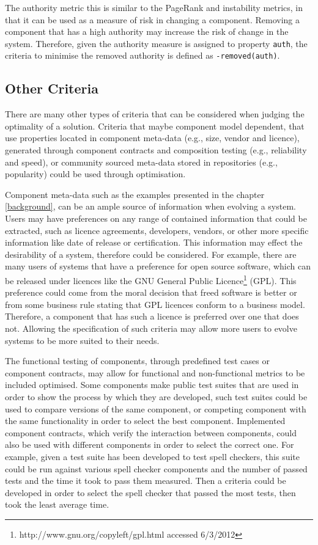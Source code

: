 The authority metric this is similar to the PageRank and instability metrics, in that it can be used as a measure of risk in changing a component.
Removing a component that has a high authority may increase the risk of change in the system.
Therefore, given the authority measure is assigned to property \verb+auth+, the criteria to minimise the removed authority is defined as \verb!-removed(auth)!.

\subsection{Other Criteria}
There are many other types of criteria that can be considered when judging the optimality of a solution.
Criteria that maybe component model dependent, that use properties located in component meta-data (e.g., size, vendor and licence),
generated through component contracts and composition testing (e.g., reliability and speed),
or community sourced meta-data stored in repositories (e.g., popularity) could be used through optimisation.

Component meta-data such as the examples presented in the chapter \ref{background}, can be an ample source of information when evolving a system.
Users may have preferences on any range of contained information that could be extracted, such as licence agreements, developers, vendors,
or other more specific information like date of release or certification.
This information may effect the desirability of a system, therefore could be considered. 
For example, there are many users of systems that have a preference for open source software, 
which can be released under licences like the GNU General Public Licence\footnote{http://www.gnu.org/copyleft/gpl.html accessed 6/3/2012} (GPL).
This preference could come from the moral decision that freed software is better or from some business rule stating that GPL licences conform to a business model.
Therefore, a component that has such a licence is preferred over one that does not.
Allowing the specification of such criteria may allow more users to evolve systems to be more suited to their needs.

The functional testing of components, through predefined test cases or component contracts, may allow for functional and non-functional metrics to be included optimised.
Some components make public test suites that are used in order to show the process by which they are developed,
such test suites could be used to compare versions of the same component, or competing component with the same functionality in order to select the best component.
Implemented component contracts, which verify the interaction between components, could also be used with different components in order to select the correct one. 
For example, given a test suite has been developed to test spell checkers, 
this suite could be run against various spell checker components and the number of passed tests and the time it took to pass them measured.
Then a criteria could be developed in order to select the spell checker that passed the most tests, then took the least average time.

